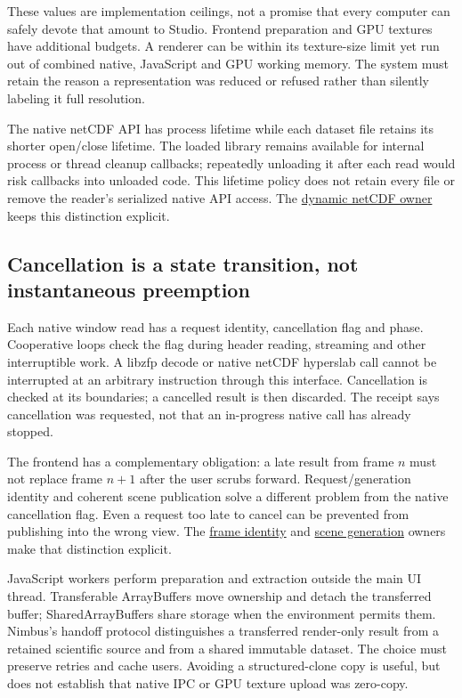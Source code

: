 These values are implementation ceilings, not a promise that every computer
can safely devote that amount to Studio. Frontend preparation and GPU textures
have additional budgets. A renderer can be within its texture-size limit yet
run out of combined native, JavaScript and GPU working memory. The system must
retain the reason a representation was reduced or refused rather than silently
labeling it full resolution.

The native netCDF API has process lifetime while each dataset file retains its
shorter open/close lifetime. The loaded library remains available for internal
process or thread cleanup callbacks; repeatedly unloading it after each read
would risk callbacks into unloaded code. This lifetime policy does not retain
every file or remove the reader's serialized native API access. The
\href{../ui/src-tauri/src/commands/netcdf_dynamic.rs}{dynamic netCDF owner}
keeps this distinction explicit.

\subsection{Cancellation is a state transition, not instantaneous preemption}

Each native window read has a request identity, cancellation flag and phase.
Cooperative loops check the flag during header reading, streaming and other
interruptible work. A libzfp decode or native netCDF hyperslab call cannot be
interrupted at an arbitrary instruction through this interface. Cancellation
is checked at its boundaries; a cancelled result is then discarded. The
receipt says cancellation was requested, not that an in-progress native call
has already stopped.

The frontend has a complementary obligation: a late result from frame $n$ must
not replace frame $n+1$ after the user scrubs forward. Request/generation
identity and coherent scene publication solve a different problem from the
native cancellation flag. Even a request too late to cancel can be prevented
from publishing into the wrong view. The
\href{../ui/src/lib/run/frameIdentity.ts}{frame identity} and
\href{../ui/src/lib/vtk/coherentSceneGeneration.ts}{scene generation}
owners make that distinction explicit.

JavaScript workers perform preparation and extraction outside the main UI
thread. Transferable ArrayBuffers move ownership and detach the transferred
buffer; SharedArrayBuffers share storage when the environment permits them.
Nimbus's handoff protocol distinguishes a transferred render-only result from
a retained scientific source and from a shared immutable dataset. The choice
must preserve retries and cache users. Avoiding a structured-clone copy is
useful, but does not establish that native IPC or GPU texture upload was
zero-copy.

